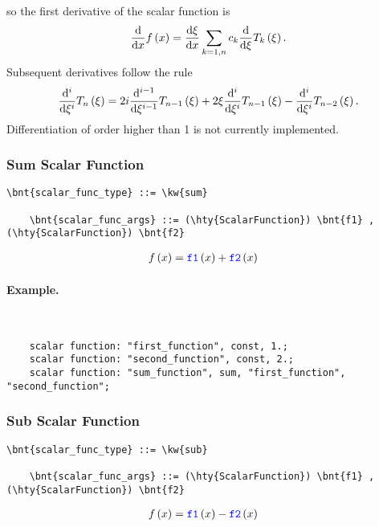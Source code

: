 so the first derivative of the scalar function is
\begin{equation}
	\frac{\mathrm{d}}{\mathrm{d}x}f\left( x \right) = \frac{\mathrm{d}\xi}{\mathrm{d}x} \sum_{k=1,n} c_k \frac{\mathrm{d}}{\mathrm{d}\xi} T_k\left( \xi \right) .
\end{equation}
Subsequent derivatives follow the rule
\begin{equation}
	\frac{\mathrm{d}^i}{\mathrm{d}\xi^i}T_n\left( \xi \right) = 
		2 i \frac{\mathrm{d}^{i-1}}{\mathrm{d}\xi^{i-1}}T_{n-1}\left( \xi \right)
		+ 2 \xi \frac{\mathrm{d}^i}{\mathrm{d}\xi^i}T_{n-1}\left( \xi \right)
		- \frac{\mathrm{d}^i}{\mathrm{d}\xi^i}T_{n-2}\left( \xi \right) .
\end{equation}
Differentiation of order higher than 1 is not currently implemented.




\subsubsection{Sum Scalar Function}
\begin{Verbatim}[commandchars=\\\{\}]
    \bnt{scalar_func_type} ::= \kw{sum}

    \bnt{scalar_func_args} ::= (\hty{ScalarFunction}) \bnt{f1} , (\hty{ScalarFunction}) \bnt{f2}
\end{Verbatim}
\begin{align}
	f\left( x \right)
	&=
	\textcolor{blue}{\texttt{f1}}\left( x \right) + \textcolor{blue}{\texttt{f2}}\left( x \right)
\end{align}

\paragraph{Example.} \
\begin{verbatim}
    scalar function: "first_function", const, 1.;
    scalar function: "second_function", const, 2.;
    scalar function: "sum_function", sum, "first_function", "second_function";
\end{verbatim}


\subsubsection{Sub Scalar Function}
\begin{Verbatim}[commandchars=\\\{\}]
    \bnt{scalar_func_type} ::= \kw{sub}

    \bnt{scalar_func_args} ::= (\hty{ScalarFunction}) \bnt{f1} , (\hty{ScalarFunction}) \bnt{f2}
\end{Verbatim}
\begin{align}
	f\left( x \right)
	&=
	\textcolor{blue}{\texttt{f1}}\left( x \right) - \textcolor{blue}{\texttt{f2}}\left( x \right)
\end{align}

